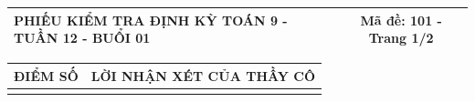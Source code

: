 \documentclass[12pt,a4paper]{article}
\begin{document}
\pagestyle{empty}
\noindent
\begin{tabularx}{\linewidth}{|X|c|}
\hline
\textbf{PHIẾU KIỂM TRA ĐỊNH KỲ TOÁN 9 - TUẦN 12 - BUỔI 01} & \textbf{Mã đề: 101 - Trang 1/2} \\
\hline
\end{tabularx}

\vspace{1.0mm}

\noindent
\begin{tabularx}{\linewidth}{|p{3.2cm}|X|}
\hline
\centering\textbf{ĐIỂM SỐ} & \centering\textbf{LỜI NHẬN XÉT CỦA THẦY CÔ} \tabularnewline
\hline
\rule{0pt}{1.8cm} & \tabularnewline
\hline
\end{tabularx}
\end{document}
